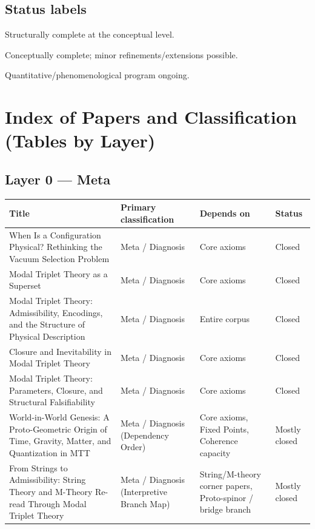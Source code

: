 \documentclass[11pt]{article}
\begin{document}
\subsection{Status labels}

\begin{description}[leftmargin=!,labelwidth=2.6cm]
\item[Closed] Structurally complete at the conceptual level.
\item[Mostly closed] Conceptually complete; minor refinements/extensions possible.
\item[Open] Quantitative/phenomenological program ongoing.
\end{description}


\section{Index of Papers and Classification (Tables by Layer)}

\subsection{Layer 0 --- Meta}

\begin{center}
\small
\begin{tabular}{|p{7.2cm}|p{3.6cm}|p{3.6cm}|p{1.6cm}|}
\hline
\textbf{Title} & \textbf{Primary classification} & \textbf{Depends on} & \textbf{Status}\\
\hline
When Is a Configuration Physical? Rethinking the Vacuum Selection Problem
& Meta / Diagnosis & Core axioms & Closed\\
\hline
Modal Triplet Theory as a Superset
& Meta / Diagnosis & Core axioms & Closed\\
\hline
Modal Triplet Theory: Admissibility, Encodings, and the Structure of Physical Description
& Meta / Diagnosis & Entire corpus & Closed\\
\hline
Closure and Inevitability in Modal Triplet Theory &
Meta / Diagnosis & Core axioms & Closed \\
\hline
Modal Triplet Theory: Parameters, Closure, and Structural Falsifiability &
Meta / Diagnosis & Core axioms & Closed \\
\hline
World-in-World Genesis: A Proto-Geometric Origin of Time, Gravity, Matter, and Quantization in MTT
& Meta / Diagnosis (Dependency Order)
& Core axioms, Fixed Points, Coherence capacity
& Mostly closed\\
\hline
From Strings to Admissibility: String Theory and M-Theory Re-read Through Modal Triplet Theory
& Meta / Diagnosis (Interpretive Branch Map)
& String/M-theory corner papers, Proto-spinor / bridge branch
& Mostly closed\\
\hline

\end{tabular}
\end{center}
\end{document}
